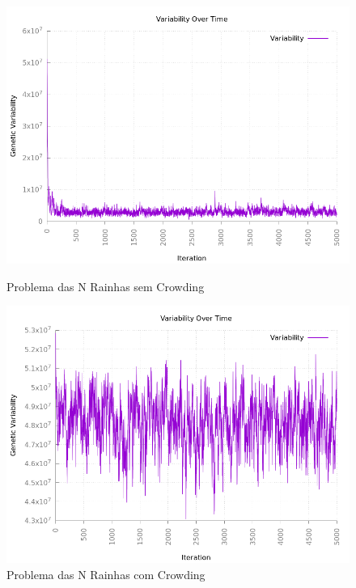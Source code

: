 \documentclass[12pt]{article}
\begin{document}
\begin{figure}[h!]
    \centering
    \begin{minipage}{0.47\textwidth}
        \centering
        \includegraphics[width=\textwidth]{pictures/queensvarscalingoff}
        \caption{Problema das N Rainhas sem Crowding}
        \label{f310}
    \end{minipage}
    \begin{minipage}{0.47\textwidth}
        \centering
        \includegraphics[width=\textwidth]{pictures/64queensvariabilitycrowding}
        \caption{Problema das N Rainhas com Crowding}
        \label{crowding}
    \end{minipage}
\end{figure}
\end{document}
